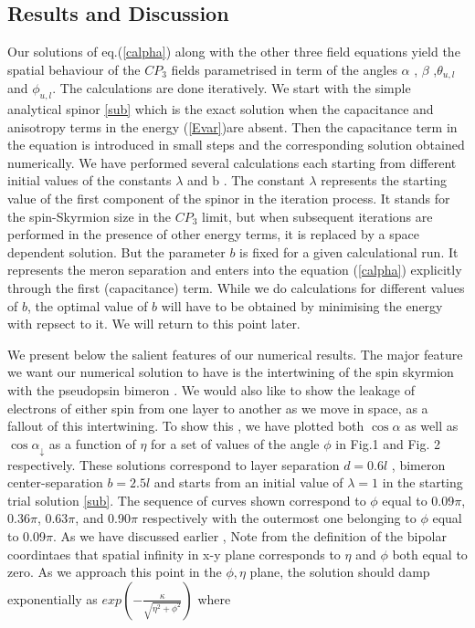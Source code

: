 \subsection{Results and Discussion}
Our solutions of eq.(\ref{calpha}) along with the other three
field equations 
yield the spatial behaviour of the $CP_{3}$  fields
parametrised in term of the angles $\alpha$ , $\beta$ ,$\theta_{u,l}$
and $\phi_{u,l}$. The calculations are done iteratively. We start with
 the simple analytical spinor \ref{sub} which is the exact solution 
 when the capacitance and anisotropy terms in the energy (\ref{Evar})are 
 absent. Then the capacitance  term in the equation is
 introduced in small steps and the corresponding solution obtained
 numerically.
We have performed  several calculations each starting from
different initial values of the constants
 $\lambda$ and b . The constant
 $\lambda$  represents the starting value of the first component
 of the spinor in the iteration process. It stands for the spin-Skyrmion 
 size  in the $CP_3$ limit, but when subsequent iterations are performed
 in the presence of other energy terms, it is replaced by a space
 dependent solution. But the parameter $b$ is fixed for a given
  calculational run. It represents the meron separation and enters into the 
 equation (\ref{calpha}) 
explicitly through the first (capacitance) term. While we do calculations
for different values of $b$, the optimal value of $b$ will
have to be obtained by minimising the energy with repsect to it.
We will return to this point later.

We  present below  the salient features of our numerical results.
The major feature we want our  numerical solution  to have
is  the intertwining of the spin skyrmion with the pseudopsin
bimeron . We would also like to show the leakage of electrons of either spin
from one layer to another as we move in space, 
as a fallout of this intertwining. To show this 
, we have plotted both $\cos \alpha$ as well as $\cos 
\alpha_{\downarrow}$ as a function of $\eta$ for a set of values 
of the angle $\phi$ in Fig.1 and Fig. 2 respectively.
These solutions correspond to layer separation $ d= 0.6l$ ,
bimeron center-separation $b = 2.5l$ and starts from an initial value
of  $\lambda = 1$ in the starting trial solution \ref{sub}. 
The sequence of curves shown
correspond to $\phi$ equal to 0.09$\pi$, 0.36$\pi$, 0.63$\pi$, and 0.90$\pi$
respectively with the outermost one belonging to $\phi$ equal to 0.09$\pi$.
 As we have discussed earlier \cite{Ghosh2}, 
Note from the definition of the bipolar coordintaes
that spatial infinity in x-y plane corresponds to  $\eta$ and $\phi$ both 
equal to zero. As we approach this point in the $\phi , \eta$ plane, 
the solution
should damp exponentially as
$exp(-\frac{\kappa}{\sqrt{\eta^{2}+\phi^{2}}})$ where 

